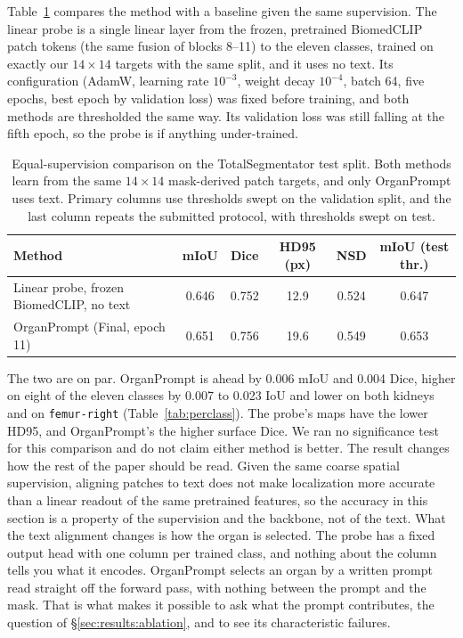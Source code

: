 \documentclass[10pt]{article}
\newcommand{\org}[1]{\texttt{#1}}
\begin{document}
Table~\ref{tab:equalsup} compares the method with a baseline given the same
supervision. The linear probe is a single linear layer from the frozen,
pretrained BiomedCLIP patch tokens (the same fusion of blocks 8--11) to the eleven
classes, trained on exactly our $14\times14$ targets with the same split, and it
uses no text. Its configuration (AdamW, learning rate $10^{-3}$, weight decay
$10^{-4}$, batch 64, five epochs, best epoch by validation loss) was fixed before
training, and both methods are thresholded the same way. Its validation loss was
still falling at the fifth epoch, so the probe is if anything under-trained.

\begin{table}[!htbp]
\centering
\small
\caption{Equal-supervision comparison on the TotalSegmentator test split. Both
methods learn from the same $14\times14$ mask-derived patch targets, and only OrganPrompt uses text. Primary columns use thresholds swept on the validation
split, and the last column repeats the submitted protocol, with thresholds swept on
test.}
\label{tab:equalsup}
\begin{tabular}{lccccc}
\toprule
Method & mIoU & Dice & HD95 (px) & NSD & mIoU (test thr.) \\
\midrule
Linear probe, frozen BiomedCLIP, no text & 0.646 & 0.752 & 12.9 & 0.524 & 0.647 \\
OrganPrompt (Final, epoch 11) & 0.651 & 0.756 & 19.6 & 0.549 & 0.653 \\
\bottomrule
\end{tabular}
\end{table}

The two are on par. OrganPrompt is ahead by 0.006 mIoU and 0.004 Dice, higher on
eight of the eleven classes by 0.007 to 0.023 IoU and lower on both kidneys and on
\org{femur-right} (Table~\ref{tab:perclass}). The probe's maps have the lower
HD95, and OrganPrompt's the higher surface Dice. We ran no significance test
for this comparison and do not claim either method is better. The result changes
how the rest of the paper should be read. Given the same coarse spatial
supervision, aligning patches to text does not make localization more accurate
than a linear readout of the same pretrained features, so the accuracy in this
section is a property of the supervision and the backbone, not of the text.
What the text alignment changes is how the organ is selected. The probe has a fixed output head
with one column per trained class, and nothing about the column tells you what it
encodes. OrganPrompt selects an organ by a written prompt read straight off the
forward pass, with nothing between the prompt and the mask. That is what makes it possible to ask what the prompt contributes, the question of
\S\ref{sec:results:ablation}, and to see its characteristic failures.
\end{document}
